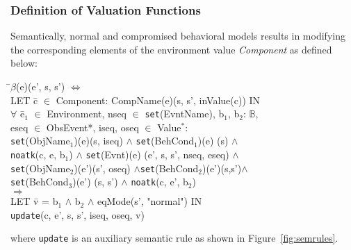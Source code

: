 \documentclass[conference]{IEEEtran}
\begin{document}
\subsubsection{Definition of Valuation Functions}
Semantically, normal and compromised behavioral models results in modifying the corresponding elements of the environment value \emph{Component} as defined below:
\begin{tabbing}
\textlbrackdbl\=$\beta$\textrbrackdbl (e)(e', s, s') $\Leftrightarrow$ 
\\\> LET \= c $\in$ Component: \textlbrackdbl CompName\textrbrackdbl(e)(s, s', inValue(c)) IN
\\\> $\forall$ \=e$_1$ $\in$ Environment, nseq $\in$ \texttt{set}(EvntName), b$_1$, b$_2$: $\mathbb{B}$,
\\\>\> eseq $\in$ ObsEvent*, iseq, oseq $\in$ Value$^*$: \\\>\> \textlbrackdbl \texttt{set}(ObjName$_1$)\textrbrackdbl (e)(s, iseq) $\wedge$ \textlbrackdbl \texttt{set}(BehCond$_1$)\textrbrackdbl (e) (s) $\wedge$
\\\>\> {\tt noatk}(c, e, b$_1$) $\wedge$ \textlbrackdbl \texttt{set}(Evnt)\textrbrackdbl (e) (e', s, s', nseq, eseq) $\wedge$
\\\>\> \textlbrackdbl \texttt{set}(ObjName$_2$)\textrbrackdbl (e')(s', oseq) $\wedge$\textlbrackdbl \texttt{set}(BehCond$_2$)\textrbrackdbl(e')(s,s')$\wedge$ 
\\\>\> \textlbrackdbl \texttt{set}(BehCond$_3$)\textrbrackdbl (e') (s, s') $\wedge$ {\tt noatk}(c, e', b$_2$)
\\\>\>$\Rightarrow$
\\\>\> LET \=v = b$_1$ $\wedge$ b$_2$ $\wedge$ eqMode(s', "normal") IN
\\\>\>\> {\tt update}(c, e', s, s', iseq, oseq, v)
\end{tabbing}
where {\tt update} is an auxiliary semantic rule as shown in Figure~\ref{fig:semrules}.
\end{document}
